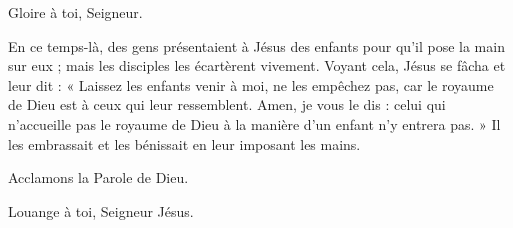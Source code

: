 \rubricatum{\Rbardot{}} Gloire à toi, Seigneur.

En ce temps-là, des gens présentaient à Jésus des enfants
pour qu’il pose la main sur eux ;
mais les disciples les écartèrent vivement.
Voyant cela, Jésus se fâcha et leur dit :
« Laissez les enfants venir à moi, ne les empêchez pas,
car le royaume de Dieu est à ceux qui leur ressemblent.
Amen, je vous le dis : celui qui n’accueille pas le royaume de Dieu
à la manière d’un enfant n’y entrera pas. »
Il les embrassait et les bénissait en leur imposant les mains.

Acclamons la Parole de Dieu.

\rubricatum{\Rbardot{}} Louange à toi, Seigneur Jésus.
